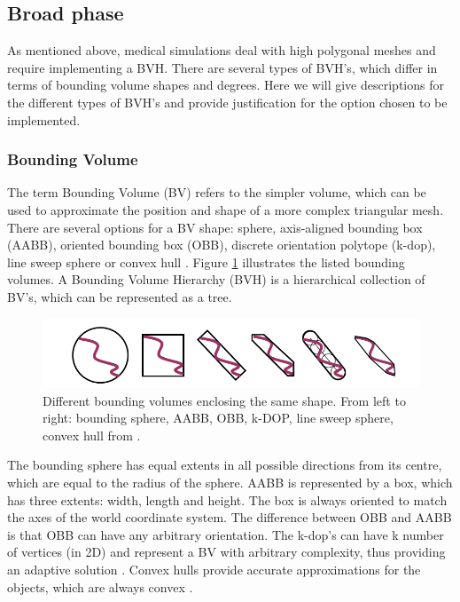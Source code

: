   \subsection{Broad phase}
  As mentioned above, medical simulations deal with high polygonal meshes and require implementing a BVH. There are several types of BVH's, which differ in terms of bounding volume shapes and degrees. Here we will give descriptions for the different types of BVH's and provide justification for the option chosen to be implemented.

    \subsubsection{Bounding Volume}
    The term Bounding Volume (BV) refers to the simpler volume, which can be used to approximate the position and shape of a more complex triangular mesh. There are several options for a BV shape: sphere, axis-aligned bounding box (AABB), oriented bounding box (OBB), discrete orientation polytope (k-dop), line sweep sphere or convex hull \citep{BVs}. Figure \ref{BVs} illustrates the listed bounding volumes. A Bounding Volume Hierarchy (BVH) is a hierarchical collection of BV's, which can be represented as a tree.

          \begin{figure}
            \centering
              \includegraphics[width=120mm]{sections/methodology/images/contact/BVs.png}
            \caption[Different bounding volumes enclosing the same shape.]{\label{BVs} Different bounding volumes enclosing the same shape. From left to right: bounding sphere, AABB, OBB, k-DOP, line sweep sphere, convex hull from \citep{BVs}.}
          \end{figure}

    The bounding sphere has equal extents in all possible directions from its centre, which are equal to the radius of the sphere. AABB is represented by a box, which has three extents: width, length and height. The box is always oriented to match the axes of the world coordinate system. The difference between OBB and AABB is that OBB can have any arbitrary orientation. The k-dop's can have k number of vertices (in 2D) and represent a BV with arbitrary complexity, thus providing an adaptive solution \citep{realTimeColDet}. Convex hulls provide accurate approximations for the objects, which are always convex \citep{convexhulls}.

